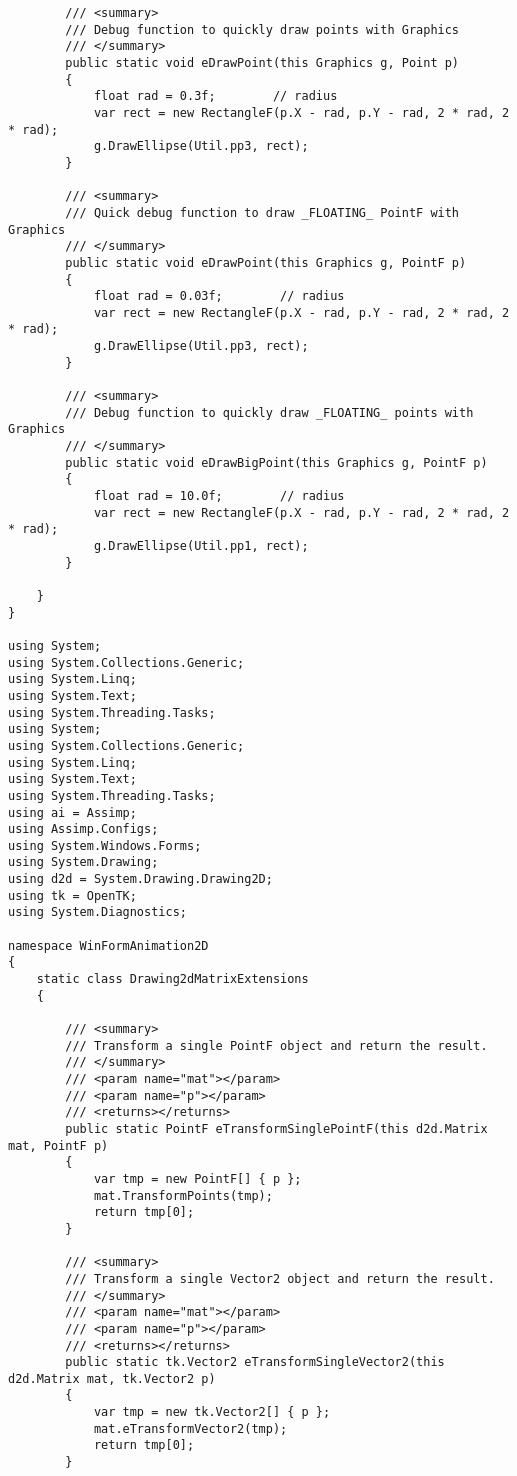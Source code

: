\begin{scriptsize}
\begin{verbatim}
        /// <summary>
        /// Debug function to quickly draw points with Graphics
        /// </summary>
        public static void eDrawPoint(this Graphics g, Point p)
        {
            float rad = 0.3f;        // radius
            var rect = new RectangleF(p.X - rad, p.Y - rad, 2 * rad, 2 * rad);
            g.DrawEllipse(Util.pp3, rect);
        }

        /// <summary>
        /// Quick debug function to draw _FLOATING_ PointF with Graphics
        /// </summary>
        public static void eDrawPoint(this Graphics g, PointF p)
        {
            float rad = 0.03f;        // radius
            var rect = new RectangleF(p.X - rad, p.Y - rad, 2 * rad, 2 * rad);
            g.DrawEllipse(Util.pp3, rect);
        }

        /// <summary>
        /// Debug function to quickly draw _FLOATING_ points with Graphics
        /// </summary>
        public static void eDrawBigPoint(this Graphics g, PointF p)
        {
            float rad = 10.0f;        // radius
            var rect = new RectangleF(p.X - rad, p.Y - rad, 2 * rad, 2 * rad);
            g.DrawEllipse(Util.pp1, rect);
        }

    }
}

using System;
using System.Collections.Generic;
using System.Linq;
using System.Text;
using System.Threading.Tasks;
using System;
using System.Collections.Generic;
using System.Linq;
using System.Text;
using System.Threading.Tasks;
using ai = Assimp;
using Assimp.Configs;
using System.Windows.Forms;
using System.Drawing;
using d2d = System.Drawing.Drawing2D;
using tk = OpenTK;
using System.Diagnostics;

namespace WinFormAnimation2D
{
    static class Drawing2dMatrixExtensions
    {

        /// <summary>
        /// Transform a single PointF object and return the result.
        /// </summary>
        /// <param name="mat"></param>
        /// <param name="p"></param>
        /// <returns></returns>
        public static PointF eTransformSinglePointF(this d2d.Matrix mat, PointF p)
        {
            var tmp = new PointF[] { p };
            mat.TransformPoints(tmp);
            return tmp[0];
        }

        /// <summary>
        /// Transform a single Vector2 object and return the result.
        /// </summary>
        /// <param name="mat"></param>
        /// <param name="p"></param>
        /// <returns></returns>
        public static tk.Vector2 eTransformSingleVector2(this d2d.Matrix mat, tk.Vector2 p)
        {
            var tmp = new tk.Vector2[] { p };
            mat.eTransformVector2(tmp);
            return tmp[0];
        }


\end{verbatim}
\end{scriptsize}
